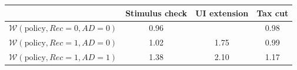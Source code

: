 \begin{tabular}{@{}lccc@{}} 
\toprule 
                          & Stimulus check      & UI extension    & Tax cut    \\  \midrule 
$\mathcal{W}(\text{policy}, Rec=0, AD=0)$ & 0.96  &   & 0.98     \\ 
$\mathcal{W}(\text{policy}, Rec=1, AD=0)$ & 1.02  & 1.75  & 0.99     \\ 
$\mathcal{W}(\text{policy}, Rec=1, AD=1)$ & 1.38  & 2.10  & 1.17     \\ \bottomrule 
\end{tabular}  
